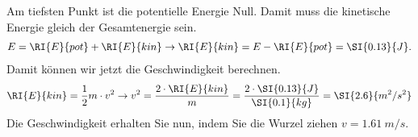 \begin{aufgabe}
\begin{loesung}
\begin{enumerate}[a)]
				Am tiefsten Punkt ist die potentielle Energie Null. Damit muss die kinetische Energie gleich der Gesamtenergie sein.
				\begin{eqnarray*}
					E =\RI{E}{pot} + \RI{E}{kin} \to \RI{E}{kin} = E - \RI{E}{pot}= \SI{0.13}{J}\text{.} 
				\end{eqnarray*}
				Damit können wir jetzt die Geschwindigkeit berechnen.
				\begin{eqnarray*}
					\RI{E}{kin} =\frac{1}{2} m\cdot v^2 \to v^2 =\frac{2 \cdot\RI{E}{kin}}{m}=\frac{2\cdot\SI{0.13}{J}}{\SI{0.1}{kg}} = \SI{2.6}{m^2/s^2}
				\end{eqnarray*}
				Die Geschwindigkeit erhalten Sie nun, indem Sie die Wurzel ziehen $v=\SI{1.61}{m/s}$.


		\end{enumerate}
	\end{loesung}

\end{aufgabe}
